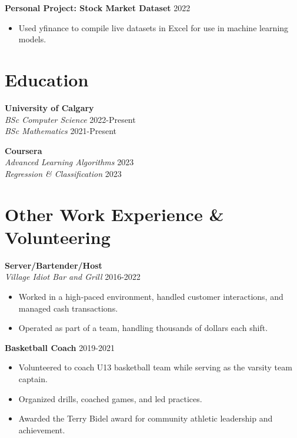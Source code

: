 \documentclass[a4paper,10pt]{article}
\begin{document}
\textbf{Personal Project: Stock Market Dataset} \hfill 2022
\begin{itemize}[leftmargin=0.5cm]
    \item Used yfinance to compile live datasets in Excel for use in machine learning models.
\end{itemize}

\vspace{0.2cm}

\section*{Education}

\noindent
\begin{minipage}[t]{0.45\textwidth} %
    \textbf{University of Calgary} \\
    \textit{BSc Computer Science} \hfill 2022-Present \\
    \textit{BSc Mathematics} \hfill 2021-Present
\end{minipage}
\hfill %
\begin{minipage}[t]{0.45\textwidth} %
    \textbf{Coursera} \\
    \textit{Advanced Learning Algorithms} \hfill 2023 \\
    \textit{Regression \& Classification} \hfill 2023
\end{minipage}

\vspace{0.2cm}

\section*{Other Work Experience \& Volunteering}

\textbf{Server/Bartender/Host} \\
\textit{Village Idiot Bar and Grill} \hfill 2016-2022
\begin{itemize}[leftmargin=0.5cm]
    \item Worked in a high-paced environment, handled customer interactions, and managed cash transactions.
    \item Operated as part of a team, handling thousands of dollars each shift.
\end{itemize}

\textbf{Basketball Coach} \hfill 2019-2021
\begin{itemize}[leftmargin=0.5cm]
    \item Volunteered to coach U13 basketball team while serving as the varsity team captain.
    \item Organized drills, coached games, and led practices.
    \item Awarded the Terry Bidel award for community athletic leadership and achievement.
\end{itemize}
\end{document}
